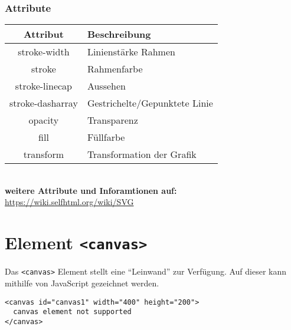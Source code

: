 \subsubsection{Attribute}
\begin{tabular}{|c|l|}
\hline
\rowcolor{lstback}\textbf{Attribut}	&\textbf{Beschreibung}\\
\hline
stroke-width	&Linienstärke Rahmen\\
\hline
stroke		&Rahmenfarbe\\
\hline
stroke-linecap	&Aussehen\\
\hline
stroke-dasharray	&Gestrichelte/Gepunktete Linie\\
\hline
opacity		&Transparenz\\
\hline
fill			&Füllfarbe\\
\hline
transform		&Transformation der Grafik\\
\hline
\end{tabular}\\[1em]
\textbf{weitere Attribute und Inforamtionen auf:} \href{https://wiki.selfhtml.org/wiki/SVG}{https://wiki.selfhtml.org/wiki/SVG}
\section{Element \texttt{<canvas>}}
Das \texttt{<canvas>} Element stellt eine ``Leinwand'' zur Verfügung. Auf dieser kann mithilfe von JavaScript gezeichnet werden.\\[-1.5em]
\begin{verbatim}
<canvas id="canvas1" width="400" height="200">
  canvas element not supported
</canvas>
\end{verbatim}
